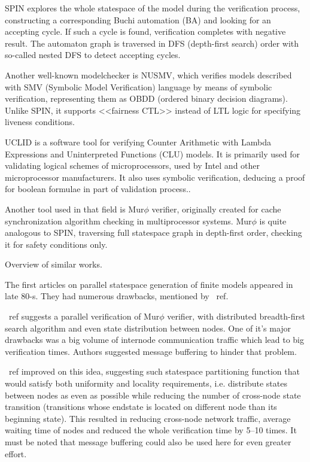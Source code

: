 \begin{table}
SPIN explores the whole statespace of the model during the verification process,
constructing a corresponding Buchi automation (BA) and looking for an accepting
cycle. If such a cycle is found, verification completes with negative result. The
automaton graph is traversed in DFS (depth-first search) order with so-called nested
DFS to detect accepting cycles.

Another well-known modelchecker is NUSMV, which verifies models described with SMV
(Symbolic Model Verification) language by means of symbolic verification, representing
them as OBDD (ordered binary decision diagrams). Unlike SPIN, it supports <<fairness CTL>>
instead of LTL logic for specifying liveness conditions.

UCLID is a software tool for verifying Counter Arithmetic with Lambda Expressions and
Uninterpreted Functions (CLU) models. It is primarily used for validating logical schemes
of microprocessors, used by Intel and other microprocessor manufacturers. It also uses
symbolic verification, deducing a proof for boolean formulae in part of validation
process..

Another tool used in that field is Mur$\phi$ verifier, originally created for cache
synchronization algorithm checking in multiprocessor systems. Mur$\phi$ is quite analogous
to SPIN, traversing full statespace graph in depth-first order, checking it for safety
conditions only.

Overview of similar works.

The first articles on parallel statespace generation of finite models appeared in late
80-s. They had numerous drawbacks, mentioned by ~ref.

~ref suggests a parallel verification of Mur$\phi$ verifier, with distributed
breadth-first search algorithm and even state distribution between nodes. One of it's
major drawbacks was a big volume of internode communication traffic which lead to big
verification times. Authors suggested message buffering to hinder that problem.

~ref improved on this idea, suggesting such statespace partitioning function that would
satisfy both uniformity and locality requirements, i.e. distribute states between nodes as
even as possible while reducing the number of cross-node state transition (transitions
whose endstate is located on different node than its beginning state). This resulted in
reducing cross-node network traffic, average waiting time of nodes and reduced the whole
verification time by 5--10 times. It must be noted that message buffering could also be
used here for even greater effort.


\end{table}
